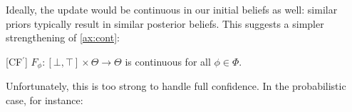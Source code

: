 
Ideally, the update would be continuous in our initial
beliefs as well: similar priors typically result
in similar posterior beliefs.
This suggests a simpler strengthening of \cref{ax:cont}:

\begin{CFaxioms}[nosep]
	\item
	[CF{\the\numexpr\value{CFaxiomsi}\relax}${^\prime}$]
	$F_\phi : [\bot,\!\top] \times \Theta \to \Theta$ is continuous
	for all $\phi \in \Phi$.
	\label{ax:cont-strong}
\end{CFaxioms}

Unfortunately, this is too strong to handle full confidence.
In the probabilistic case, for instance:


